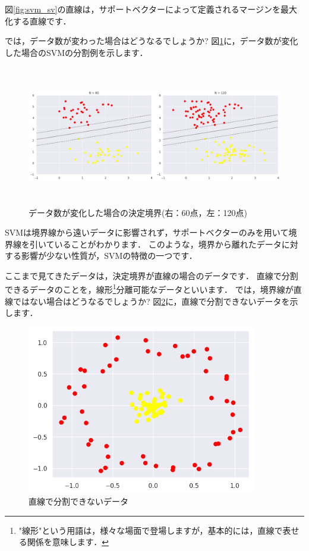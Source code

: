 \documentclass{jarticle}
\begin{document}
図\ref{fig:svm_sv}の直線は，サポートベクターによって定義されるマージンを最大化する直線です．

では，データ数が変わった場合はどうなるでしょうか?
図\ref{fig:svm_data2}に，データ数が変化した場合のSVMの分割例を示します．

\begin{figure}[H]
  \centering
  \includegraphics[height=6.1cm]{fig/svm_diff_sample_amount.png}
  \caption{データ数が変化した場合の決定境界(右：60点，左：120点)}
  \label{fig:svm_data2}
\end{figure}

SVMは境界線から遠いデータに影響されず，サポートベクターのみを用いて境界線を引いていることがわかります．
このような，境界から離れたデータに対する影響が少ない性質が，SVMの特徴の一つです．

ここまで見てきたデータは，決定境界が直線の場合のデータです．
直線で分割できるデータのことを，線形\footnote{"線形"という用語は，様々な場面で登場しますが，基本的には，直線で表せる関係を意味します．}分離可能なデータといいます．
では，境界線が直線ではない場合はどうなるでしょうか?
図\ref{fig:not_linear}に，直線で分割できないデータを示します．

\begin{figure}[H]
  \centering
  \includegraphics[width=10cm]{fig/svm_not_linear.png}
  \caption{直線で分割できないデータ}
  \label{fig:not_linear}
\end{figure}
\end{document}
